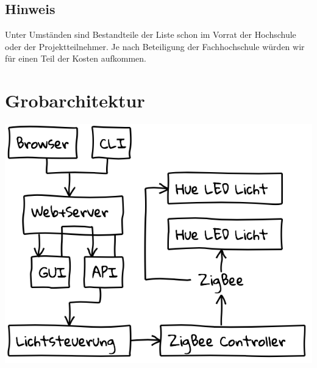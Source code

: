 \documentclass[a4paper,12pt]{article}
\begin{document}
\subsection{Hinweis}

Unter Umständen sind Bestandteile der Liste schon im Vorrat der Hochschule oder
der Projektteilnehmer. Je nach Beteiligung der Fachhochschule würden wir für einen
Teil der Kosten aufkommen.

\section{Grobarchitektur}

\includegraphics[width=\linewidth]{grobarchitektur}
\end{document}
